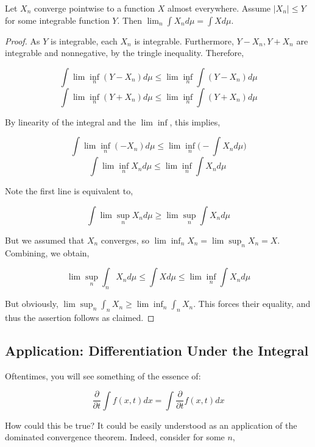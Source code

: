     \begin{theorem}
        Let $X_n$ converge pointwise to a function $X$ almost everywhere. 
        Assume $|X_n| \leq Y$ for some integrable function $Y$. Then 
        $\lim_n \int X_n d\mu = \int X d\mu$.
    \end{theorem}

    \begin{proof}
        As $Y$ is integrable, each $X_n$ is integrable. Furthermore, 
        $Y - X_n, Y + X_n$ are integrable and nonnegative, by the tringle inequality. Therefore, 

        \[  \int \lim\inf_n(Y - X_n) d\mu \leq \lim\inf_n\int(Y - X_n) d\mu \]
        \[  \int \lim\inf_n(Y + X_n) d\mu \leq \lim\inf_n \int(Y + X_n) d\mu \]

        By linearity of the integral and the $\lim\inf$, this implies,

        \[ \int \lim\inf_n (-X_n) d\mu \leq  \lim\inf_n \bigg(-\int X_nd\mu\bigg) \]
        \[ \int \lim\inf_n X_n  d\mu \leq \lim\inf_n \int X_n d\mu \ \]

        Note the first line is equivalent to, 

        \[ \int \lim\sup_n X_n d\mu \geq \lim\sup_n \int X_n d\mu  \]

        But we assumed that $X_n$ converges, so $\lim\inf_n X_n = \lim\sup_n X_n = X$. Combining, 
        we obtain, 

        \[ \lim\sup_n \int_n X_n d\mu \leq \int X d\mu \leq \lim\inf_n \int X_n d\mu \]

        But obviously, $\lim\sup_n \int_n X_n \geq \lim\inf_n \int_n X_n$. This forces their 
        equality, and thus the assertion follows as claimed.

    \end{proof}

        \subsection{Application: Differentiation Under the Integral}

        Oftentimes, you will see something of the essence of: 

        \[ \frac{\partial}{\partial t} \int f(x,t)dx =\int \frac{\partial}{\partial t}  f(x,t)dx \]

        How could this be true? It could be easily understood as an application of the dominated convergence theorem. 
        Indeed, consider for some $n$, 


